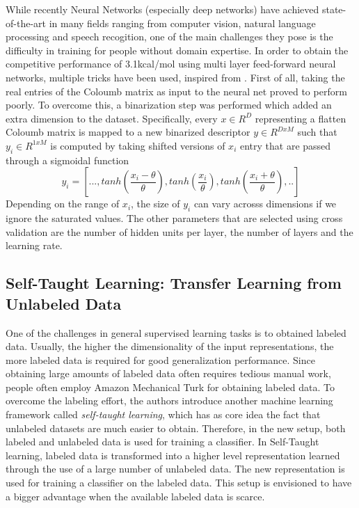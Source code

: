 \documentclass[10pt,journal,a4paper]{IEEEtran}
\begin{document}
While recently Neural Networks (especially deep networks) have achieved state-of-the-art in many fields ranging from computer vision, natural language processing and speech recogition, one of the main challenges they pose is the difficulty in training for people without domain expertise. 
In order to obtain the competitive performance of 3.1kcal/mol using multi layer feed-forward neural networks, multiple tricks have been used, inspired from \cite{tricks}. First of all, taking the real entries of the Coloumb matrix as input to the neural net proved to perform poorly.
To overcome this, a binarization step was performed which added an extra dimension to the dataset. Specifically, every $x \in R^{D}$ representing a flatten Coloumb matrix is mapped to a new binarized descriptor $y \in R^{DxM}$ such that $y_i \in R^{1xM}$ is computed by taking shifted versions of $x_i$ entry that are passed through a sigmoidal function
\begin{equation}
	y_i = [..., tanh(\frac{x_i - \theta}{\theta}), tanh(\frac{x_i}{\theta}), tanh(\frac{x_i + \theta}{\theta}),..]
\end{equation}
Depending on the range of $x_i$, the size of $y_i$ can vary acrosss dimensions if we ignore the saturated values.
The other parameters that are selected using cross validation are the number of hidden units per layer, the number of layers and the learning rate.

\subsection{Self-Taught Learning: Transfer Learning from Unlabeled Data}
 
One of the challenges in general supervised learning tasks is to obtained labeled data. Usually, the higher the dimensionality of the input representations, the more labeled data is required for good generalization performance. Since obtaining large amounts of labeled data often requires tedious manual work, people often employ Amazon Mechanical Turk for obtaining labeled data. To overcome the labeling effort, the authors introduce another machine learning framework called \textit{self-taught learning}, which has as core idea the fact that unlabeled datasets are much easier to obtain. Therefore, in the new setup, both labeled and unlabeled data is used for training a classifier. In Self-Taught learning, labeled data is transformed into a higher level representation learned through the use of a large number of unlabeled data. The new representation  is used for training a classifier on the labeled data. This setup is envisioned to have a bigger advantage when the available labeled data is scarce. 
\end{document}
